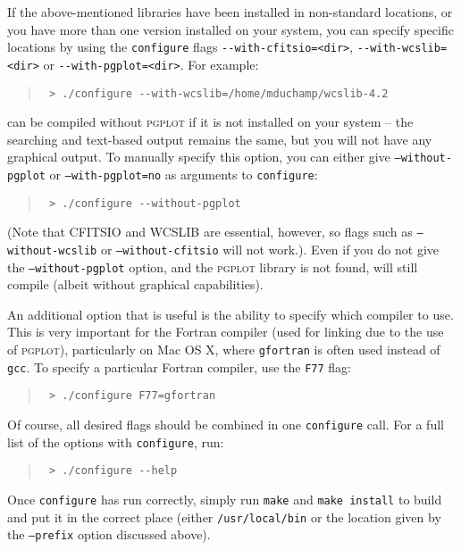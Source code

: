 If the above-mentioned libraries have been installed in non-standard
locations, or you have more than one version installed on your system,
you can specify specific locations by using the \texttt{configure} flags
\verb|--with-cfitsio=<dir>|, \verb|--with-wcslib=<dir>| or
\verb|--with-pgplot=<dir>|. For example:
\begin{quote}
{\footnotesize
\verb| > ./configure --with-wcslib=/home/mduchamp/wcslib-4.2|
}
\end{quote}

\duchamp can be compiled without \textsc{pgplot} if it is not installed
on your system -- the searching and text-based output remains the
same, but you will not have any graphical output.  To manually specify
this option, you can either give \texttt{--without-pgplot} or
\texttt{--with-pgplot=no} as arguments to \texttt{configure}:
\begin{quote}
{\footnotesize
\verb| > ./configure --without-pgplot|
}
\end{quote}

(Note that CFITSIO and WCSLIB are essential, however, so flags such as
\texttt{--without-wcslib} or \texttt{--without-cfitsio} will not
work.).  Even if you do not give the \texttt{--without-pgplot} option,
and the \textsc{pgplot} library is not found, \duchamp will still
compile (albeit without graphical capabilities).

An additional option that is useful is the ability to specify which
compiler to use. This is very important for the Fortran compiler (used
for linking due to the use of \textsc{pgplot}), particularly on Mac OS
X, where \texttt{gfortran} is often used instead of \texttt{gcc}. To
specify a particular Fortran compiler, use the \texttt{F77} flag:
\begin{quote}
{\footnotesize
\verb| > ./configure F77=gfortran|
}
\end{quote}

Of course, all desired flags should be combined in one
\texttt{configure} call. For a full list of the options with
\texttt{configure}, run:
\begin{quote}
{\footnotesize
\verb| > ./configure --help|
}
\end{quote}
Once \texttt{configure} has run correctly, simply run \texttt{make}
and \texttt{make install} to build \duchamp and put it in the correct
place (either \texttt{/usr/local/bin} or the location given by the
\texttt{--prefix} option discussed above).



